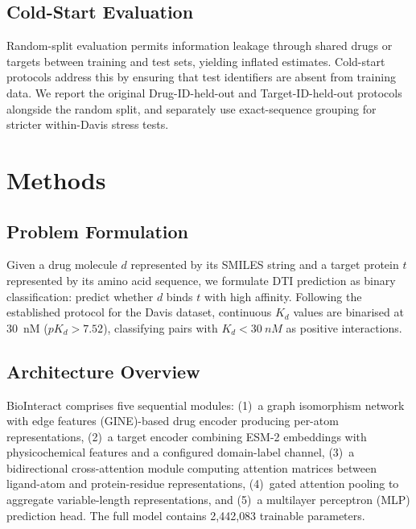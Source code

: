 \documentclass[fleqn,10pt]{wlscirep}
\begin{document}
\subsection{Cold-Start Evaluation}

Random-split evaluation permits information leakage through shared drugs or
targets between training and test sets, yielding inflated
estimates.\cite{huang2021therapeutics}  Cold-start protocols address this by
\begingroup\color{red}ensuring that test identifiers are absent from training
data. We report the original Drug-ID-held-out and Target-ID-held-out protocols
alongside the random split, and separately use exact-sequence grouping for
stricter within-Davis stress tests.\endgroup

\section{Methods}
\label{sec:methods}

\subsection{Problem Formulation}

Given a drug molecule $d$ represented by its SMILES string and a target protein
$t$ represented by its amino acid sequence, we formulate DTI prediction as
binary classification: predict whether $d$ binds $t$ with high affinity.
Following the established protocol for the Davis
dataset,\cite{davis2011comprehensive} continuous $K_d$ values are binarised
at \SI{30}{nM} ($pK_d > 7.52$), classifying pairs with $K_d < \SI{30}{nM}$ as
positive interactions.

\subsection{Architecture Overview}

BioInteract comprises five sequential modules:
(1)~a graph isomorphism network with edge features (GINE)-based drug encoder producing per-atom representations,
(2)~a target encoder combining ESM-2 embeddings with physicochemical features
and a configured domain-label channel,
(3)~a bidirectional cross-attention module computing \begingroup\color{red}attention
matrices between ligand-atom and protein-residue representations\endgroup,
(4)~gated attention pooling to aggregate variable-length representations, and
(5)~a multilayer perceptron (MLP) prediction head.
The full model contains 2{,}442{,}083 trainable parameters.
\end{document}
